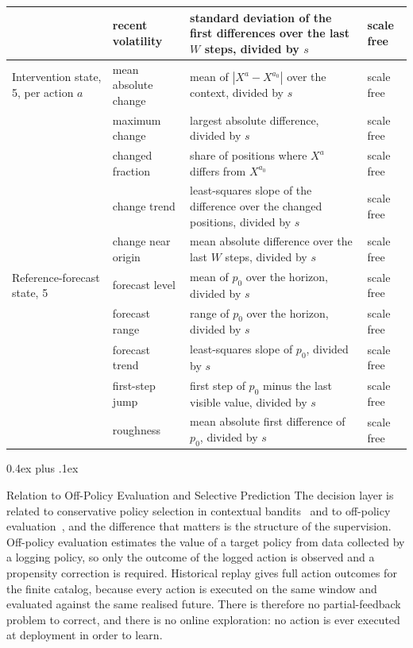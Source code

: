 \documentclass{article}
\makeatletter
\def\subsubsection{\@startsection{subsubsection}{3}{\z@}{-1.2ex plus -0.4ex minus -.2ex}%
  {0.4ex plus .1ex}{\normalsize\sc\raggedright}}
\makeatother
\begin{document}
\begin{table}[h]
{\begin{tabular}{@{}l p{} p{} p{}@{}}
     & recent volatility & standard deviation of the first differences over the last $W$ steps, divided by $s$ & scale free \\
    \midrule
    Intervention state, 5, per action $a$ & mean absolute change & mean of $|X^{a} - X^{a_0}|$ over the context, divided by $s$ & scale free \\
     & maximum change & largest absolute difference, divided by $s$ & scale free \\
     & changed fraction & share of positions where $X^{a}$ differs from $X^{a_0}$ & scale free \\
     & change trend & least-squares slope of the difference over the changed positions, divided by $s$ & scale free \\
     & change near origin & mean absolute difference over the last $W$ steps, divided by $s$ & scale free \\
    \midrule
    Reference-forecast state, 5 & forecast level & mean of $p_0$ over the horizon, divided by $s$ & scale free \\
     & forecast range & range of $p_0$ over the horizon, divided by $s$ & scale free \\
     & forecast trend & least-squares slope of $p_0$, divided by $s$ & scale free \\
     & first-step jump & first step of $p_0$ minus the last visible value, divided by $s$ & scale free \\
     & roughness & mean absolute first difference of $p_0$, divided by $s$ & scale free \\
    \bottomrule
  \end{tabular}}
\end{table}

\subsubsection{Relation to Off-Policy Evaluation and Selective Prediction}
\label{app:ope-positioning}
The decision layer is related to conservative policy selection in contextual
bandits~\citep{abbasiyadkori2011improved,lattimore2020bandit} and to off-policy
evaluation~\citep{strehl2010learning,dudik2011doubly,swaminathan2015counterfactual,
jiang2016doubly,thomas2016data}, and the difference that matters is the structure of the
supervision. Off-policy evaluation estimates the value of a target policy from data collected
by a logging policy, so only the outcome of the logged action is observed and a propensity
correction is required. Historical replay gives full action outcomes for the finite catalog,
because every action is executed on the same window and evaluated against the same realised
future. There is therefore no partial-feedback problem to correct, and there is no online
exploration: no action is ever executed at deployment in order to learn.
\end{document}
